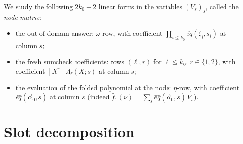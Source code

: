 \documentclass{article}
\theoremstyle{definition}
\begin{document}
We study the following $2 k_0 + 2$ linear forms in the variables $(V_s)_s$, called the \emph{node matrix}:
\begin{itemize}
    \item the out-of-domain answer: $\omega$-row, with coefficient $\prod_{i \le k_0} \hat{eq}(\zeta_i, s_i)$ at column $s$;
    \item the fresh sumcheck coefficients: rows $(\ell, r)$ for $\ell \le k_0$, $r \in \{1, 2\}$, with coefficient $[X^r]\, \Lambda_\ell(X; s)$ at column $s$;
    \item the evaluation of the folded polynomial at the node: $\eta$-row, with coefficient $\hat{eq}(\vec{\alpha}_0, s)$ at column $s$ (indeed $\hat{f}_1(\nu) = \sum_s \hat{eq}(\vec{\alpha}_0, s)\, V_s$).
\end{itemize}

\section{Slot decomposition}\label{sec:slot}
\end{document}
